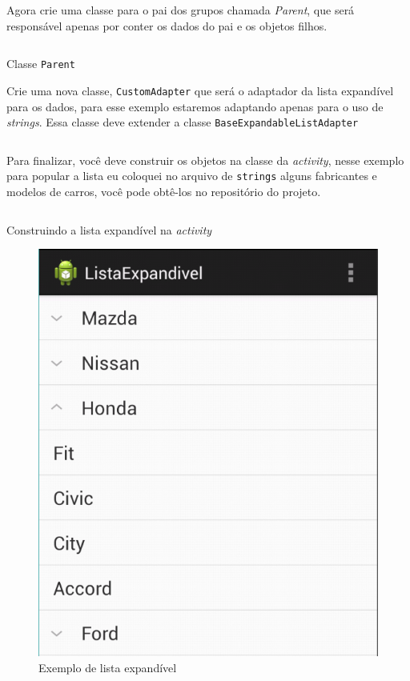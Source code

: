 \documentclass[a4paper,12pt,brazil,doubleside]{book}
\begin{document}
\begin{singlespace}
Agora crie uma classe para o pai dos grupos chamada \emph{Parent}, que será responsável apenas por conter os dados do pai e os objetos filhos.

\begin{listing}[H]
\inputminted[linenos=true,fontsize=\small,frame=lines, framesep=2mm, tabsize=2,numbersep=5pt]{java}{src/design/parent.java}
\caption{Classe \texttt{Parent}}
\end{listing}	

\newpage

Crie uma nova classe, \texttt{CustomAdapter} que será o adaptador da lista expandível para os dados, para esse exemplo estaremos adaptando apenas para o uso de \emph{strings}.
Essa classe deve extender a classe \texttt{BaseExpandableListAdapter} 

\inputminted[linenos=true,fontsize=\small,frame=lines, framesep=2mm, tabsize=2,numbersep=5pt]{java}{src/design/customadapter.java}


Para finalizar, você deve construir os objetos na classe da \emph{activity}, nesse exemplo para popular a lista eu coloquei no arquivo de \texttt{strings} alguns fabricantes e modelos de carros, você pode obtê-los no repositório do projeto.

\begin{listing}[H]
\inputminted[linenos=true,fontsize=\small,frame=lines, framesep=2mm, tabsize=2,numbersep=5pt]{java}{src/design/exlist-main.java}
\caption{Construindo a lista expandível na \emph{activity}}
\end{listing}	

\begin{figure}[H]
  \centering
  \includegraphics[width=.475\textwidth]{figuras/design/listaexpandivel.png}
  \caption{Exemplo de lista expandível}
  \label{fig:e}
\end{figure}


\end{singlespace}
\end{document}
